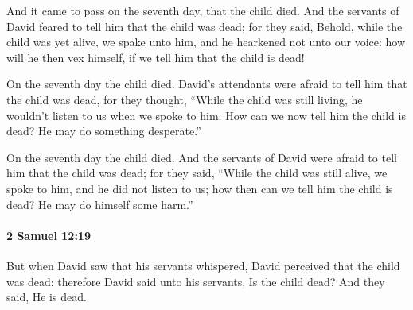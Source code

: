 			\begin{versebox}
					\item[BHS] 
					\item[ASV] And it came to pass on the seventh day, that the child died. And the servants of David feared to tell him that the child was dead; for they said, Behold, while the child was yet alive, we spake unto him, and he hearkened not unto our voice: how will he then vex himself, if we tell him that the child is dead!
					\item[NIV] On the seventh day the child died. David’s attendants were afraid to tell him that the child was dead, for they thought, “While the child was still living, he wouldn’t listen to us when we spoke to him. How can we now tell him the child is dead? He may do something desperate.”
					\item[NRSV] On the seventh day the child died. And the servants of David were afraid to tell him that the child was dead; for they said, “While the child was still alive, we spoke to him, and he did not listen to us; how then can we tell him the child is dead? He may do himself some harm.”
			\end{versebox}

		\paragraph{2 Samuel 12:19} %
			\label{2SAMUEL-12-19}

			But when David saw that his servants whispered, David perceived that the child was dead: therefore David said unto his servants, Is the child dead? And they said, He is dead.

